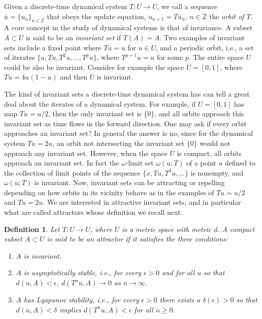 \documentclass[12 pt]{article}
\newtheorem{Definition}{Definition}[]
\begin{document}
Given a discrete-time dynamical system $T: U \to U$, we call a sequence $\bar{u} = \{u_n\}_{n\in \mathbb{Z}}$ that obeys the update equation, $u_{n+1}=Tu_n$, $n \in \mathbb{Z}$ the \emph{orbit of $T$}. A core concept in the study of dynamical systems is that of invariance. A subset $A \subset U$ is said to be an \emph{invariant set} if $T(A) =A$. 
\newline Two examples of invariant sets include a fixed point where $Tu=u$ for  $u\in U$, and a periodic orbit, i.e., a set of iterates $\{u,Tu, T^2u,\ldots,T^pu\}$, where $T^{p+1}u=u$ for some $p$.  The entire space $U$ could be also be invariant. Consider for example the space $U=[0,1]$, where $Tu=4u(1-u)$ and then $U$ is invariant. 


The kind of invariant sets a discrete-time dynamical system has can tell a great deal about the iterates of a dynamical system. For example, if $U=[0,1]$ has map $Tu= u/2$, then the only invariant set is $\{0\}$, and all orbits approach this invariant set as time flows in the forward direction. One may ask if every orbit approaches an invariant set? In general the answer is no, since for the dynamical system $Tu=2u$, an orbit not intersecting the invariant set $\{0\}$ would not approach any invariant set. However,  when the space $U$ is compact, all orbits approach an invariant set. In fact the $\omega$-limit set $\omega(u;T)$ of a point $u$ defined to the collection of limit points of the sequence $\{x,Tu,T^2u,\ldots\}$ is nonempty, and $\omega(u;T)$ is invariant.  Now, invariant sets can be attracting or repelling depending on how orbits in its vicinity behave as in the examples of $Tu =u/2$ and $Tu=2u$. We are interested in attractive invariant sets, and in particular what are called attractors whose definition we recall next. 
\begin{Definition} \rm Let $T: U \to U$, where $U$  is a metric space with metric $d$. A compact subset $A \subset U$ is said to be an attractor if it satisfies the three conditions: 
\begin{enumerate}
	\item $A$ is invariant. 
	\item $A$ is asymptotically stable, i.e., for every $\epsilon > 0$ and for all $u$ so that $d(u,A) < \epsilon$, $d(T^nu,A) \to 0$ as $n\to \infty$. 
	\item $A$ has Lyapunov stability, i.e., for every $\epsilon > 0$  there exists a $\delta(\epsilon) > 0$ so that $d(u,A) < \delta$ implies $d(T^nu,A) < \epsilon$ for all $n\ge 0$.  
\end{enumerate}
\end{Definition} 
\end{document}
